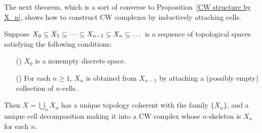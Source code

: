 The next theorem, which is a sort of converse to Proposition~\ref{CW structure by X_n}, shows how to construct CW complexes by inductively attaching cells.
\begin{theorem}\label{CW construction}
Suppose $X_0\subseteq X_1\subseteq\cdots\subseteq X_{n-1}\subseteq X_n\subseteq\dots$ is a sequence of topological spaces satisfying the following conditions:
\begin{itemize}
\item[(\rmnum{1})] $X_0$ is a nonempty discrete space.
\item[(\rmnum{2})] For each $n\geq1$, $X_n$ is obtained from $X_{n-1}$ by attaching a (possibly empty) collection of $n$-cells.
\end{itemize}
Then $X=\bigcup_nX_n$ has a unique topology coherent with the family $\{X_n\}$, and a unique cell decomposition making it into a CW complex whose $n$-skeleton is $X_n$ for each $n$.
\end{theorem}
